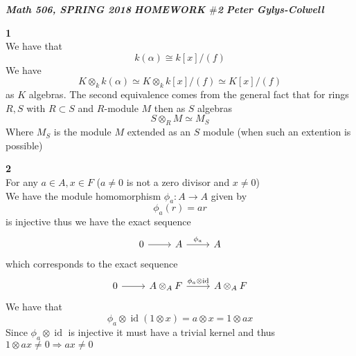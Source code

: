 \documentclass[12pt]{article}
\newenvironment{ques}[1]{\textbf{#1}\vspace{1 mm}\\ }{\bigskip}
\theoremstyle{definition}
\DeclareMathOperator\id{id}
\newcommand{\tensor}{\otimes}
\renewcommand{\a}{\alpha}
\begin{document}
\noindent \textit{\textbf{Math 506, SPRING 2018}} \hspace{1.3cm}
\textit{\textbf{HOMEWORK $\#$2}} \hspace{1.3cm} \textit{\textbf{Peter
Gylys-Colwell}} 

\vspace{1cm}

\begin{ques}{1}
	We have that
	$$k(\a) \cong k[x]/(f)$$
	We have
	$$K \tensor_k k(\a) \simeq K \tensor_k k[x]/(f) \simeq K[x]/(f)$$
	as $K$ algebras. The second equivalence comes from the general fact that
	for rings $R,S$ with $R \subset S$ and $R$-module $M$ then as $S$ algebras
	$$S \tensor_R M \simeq M_S$$
	Where $M_S$ is the module $M$ extended as an $S$ module (when such an
	extention is possible)
\end{ques}

\begin{ques}{2}
	For any $a \in A, x \in F$ ($a \neq 0$ is not a zero divisor and $x \neq 0$)\\
	We have the module homomorphism $\phi_a :A \to A$ given by 
	$$\phi_a(r) = ar$$
	is injective thus we have the exact sequence
	$$\begin{tikzcd}
	0 \arrow[r] & A \arrow[r,"\phi_a"] & A
	\end{tikzcd}$$
	which corresponds to the exact sequence
	$$\begin{tikzcd}
	0 \arrow[r] & A \otimes_A F \arrow[r,"\phi_a\otimes \id"] & A \otimes_A F
	\end{tikzcd}$$
	We have that 
	$$\phi_a\otimes \id (1 \otimes x) = a \otimes x = 1 \otimes ax$$
	Since $\phi_a\otimes \id$ is injective it must have a trivial kernel and
	thus $1 \otimes ax \neq 0 \Rightarrow ax \neq 0$
\end{ques}
\end{document}
